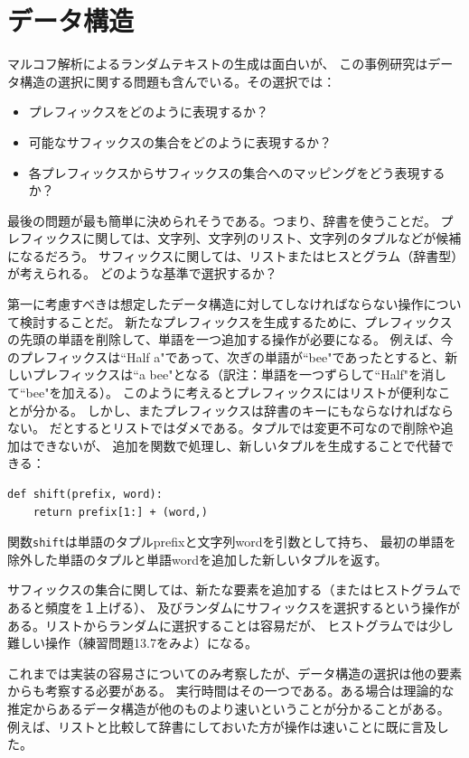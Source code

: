 \documentclass[a4j,12pt,makeidx]{jbook}
\begin{document}
\section{データ構造}
マルコフ解析によるランダムテキストの生成は面白いが、
この事例研究はデータ構造の選択に関する問題も含んでいる。その選択では：
\begin{itemize}
\item プレフィックスをどのように表現するか？
\item 可能なサフィックスの集合をどのように表現するか？
\item 各プレフィックスからサフィックスの集合へのマッピングをどう表現するか？
\end{itemize}
最後の問題が最も簡単に決められそうである。つまり、辞書を使うことだ。
プレフィックスに関しては、文字列、文字列のリスト、文字列のタプルなどが候補になるだろう。
サフィックスに関しては、リストまたはヒスとグラム（辞書型）が考えられる。
どのような基準で選択するか？\par
第一に考慮すべきは想定したデータ構造に対してしなければならない操作について検討することだ。
新たなプレフィックスを生成するために、プレフィックスの先頭の単語を削除して、単語を一つ追加する操作が必要になる。
例えば、今のプレフィックスは``Half a"であって、次ぎの単語が``bee"であったとすると、新しいプレフィックスは``a bee"となる（訳注：単語を一つずらして``Half"を消して``bee"を加える）。
このように考えるとプレフィックスにはリストが便利なことが分かる。
しかし、またプレフィックスは辞書のキーにもならなければならない。
だとするとリストではダメである。タプルでは変更不可なので削除や追加はできないが、
追加を関数で処理し、新しいタプルを生成することで代替できる：
\begin{verbatim}
def shift(prefix, word):
    return prefix[1:] + (word,)
\end{verbatim}
関数{\tt shift}は単語のタプルprefixと文字列wordを引数として持ち、
最初の単語を除外した単語のタプルと単語wordを追加した新しいタプルを返す。\par
サフィックスの集合に関しては、新たな要素を追加する（またはヒストグラムであると頻度を１上げる）、
及びランダムにサフィックスを選択するという操作がある。リストからランダムに選択することは容易だが、
ヒストグラムでは少し難しい操作（練習問題13.7をみよ）になる。\par
これまでは実装の容易さについてのみ考察したが、データ構造の選択は他の要素からも考察する必要がある。
実行時間はその一つである。ある場合は理論的な推定からあるデータ構造が他のものより速いということが分かることがある。
例えば、リストと比較して辞書にしておいた方が操作は速いことに既に言及した。
\end{document}
